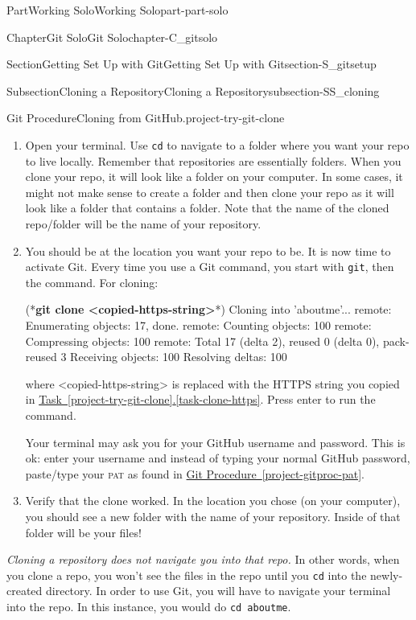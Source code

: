 \documentclass[oneside,10pt,]{book}
\newcommand{\xreffont}{\relax}
\newcommand{\mono}[1]{\texttt{#1}}
\newcommand{\acronym}[1]{\textsc{\MakeLowercase{#1}}}
\newcommand{\consoleinput}[1]{\textbf{#1}}
\begin{document}
\begin{partptx}{Part}{Working Solo}{}{Working Solo}{}{}{part-part-solo}
\begin{chapterptx}{Chapter}{Git Solo}{}{Git Solo}{}{}{chapter-C_gitsolo}
\begin{sectionptx}{Section}{Getting Set Up with Git}{}{Getting Set Up with Git}{}{}{section-S_gitsetup}
\begin{subsectionptx}{Subsection}{Cloning a Repository}{}{Cloning a Repository}{}{}{subsection-SS_cloning}
\begin{project}{Git Procedure}{Cloning from GitHub.}{project-try-git-clone}
\begin{enumerate}[font=\bfseries,label=(\alph*),ref=\alph*]
\item{}Open your terminal. Use \mono{cd} to navigate to a folder where you want your repo to live locally. Remember that repositories are essentially folders. When you clone your repo, it will look like a folder on your computer. In some cases, it might not make sense to create a folder and then clone your repo as it will look like a folder that contains a folder. Note that the name of the cloned repo\slash{}folder will be the name of your repository.%
\item{}You should be at the location you want your repo to be. It is now time to activate Git. Every time you use a Git command, you start with \mono{git}, then the command. For cloning:%
\begin{console}{0}{1}{0}
(*\consoleinput{git clone <copied-https-string>}*)
Cloning into 'aboutme'...
remote: Enumerating objects: 17, done.
remote: Counting objects: 100%
remote: Compressing objects: 100%
remote: Total 17 (delta 2), reused 0 (delta 0), pack-reused 3
Receiving objects: 100%
Resolving deltas: 100%
\end{console}
where \textless{}copied-https-string\textgreater{} is replaced with the HTTPS string you copied in \hyperref[task-clone-https]{Task~{\xreffont\ref{project-try-git-clone}}.{\xreffont\ref{task-clone-https}}}. Press enter to run the command.%
\par
Your terminal may ask you for your GitHub username and password. This is ok: enter your username and instead of typing your normal GitHub password, paste\slash{}type your \acronym{PAT} as found in \hyperref[project-gitproc-pat]{Git Procedure~{\xreffont\ref{project-gitproc-pat}}}.%
\item{}Verify that the clone worked. In the location you chose (on your computer), you should see a new folder with the name of your repository. Inside of that folder will be your files!%
\end{enumerate}%
\end{project}%
\emph{Cloning a repository does not navigate you into that repo.} In other words, when you clone a repo, you won't see the files in the repo until you \mono{cd} into the newly-created directory. In order to use Git, you will have to navigate your terminal into the repo. In this instance, you would do \mono{cd aboutme}.%
\end{subsectionptx}
%
%
\typeout{************************************************}

\end{sectionptx}
\end{chapterptx}
\end{partptx}
\end{document}
